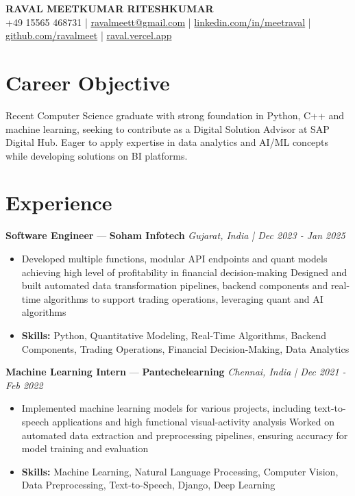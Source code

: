 \documentclass[a4paper,10pt]{article}
\begin{document}
\begin{center}
  {\Large\bfseries RAVAL MEETKUMAR RITESHKUMAR}\\[2pt]
  {\small +49 15565 468731 \;|\; \href{mailto:ravalmeett@gmail.com}{ravalmeett@gmail.com} \;|\; \href{https://www.linkedin.com/in/meetraval/}{linkedin.com/in/meetraval} \;|\; \href{https://github.com/ravalmeet}{github.com/ravalmeet} \;|\; \href{https://raval.vercel.app/}{raval.vercel.app}}
\end{center}
\vspace{-3pt}

\section*{Career Objective}
Recent Computer Science graduate with strong foundation in Python, C++ and machine learning, seeking to contribute as a Digital Solution Advisor at SAP Digital Hub. Eager to apply expertise in data analytics and AI/ML concepts while developing solutions on BI platforms.\par

\section*{Experience}
\textbf{Software Engineer} — \textbf{Soham Infotech} \hfill \textit{Gujarat, India \;|\; Dec 2023 - Jan 2025}\par
\vspace{1pt}
\begin{itemize}
  \item Developed multiple functions, modular API endpoints and quant models achieving high level of profitability in financial decision-making Designed and built automated data transformation pipelines, backend components and real-time algorithms to support trading operations, leveraging quant and AI algorithms
  \item \textbf{Skills:} Python, Quantitative Modeling, Real-Time Algorithms, Backend Components, Trading Operations, Financial Decision-Making, Data Analytics
\end{itemize}
\vspace{3pt}
\textbf{Machine Learning Intern} — \textbf{Pantechelearning} \hfill \textit{Chennai, India \;|\; Dec 2021 - Feb 2022}\par
\vspace{1pt}
\begin{itemize}
  \item Implemented machine learning models for various projects, including text-to-speech applications and high functional visual-activity analysis Worked on automated data extraction and preprocessing pipelines, ensuring accuracy for model training and evaluation
  \item \textbf{Skills:} Machine Learning, Natural Language Processing, Computer Vision, Data Preprocessing, Text-to-Speech, Django, Deep Learning
\end{itemize}
\end{document}

